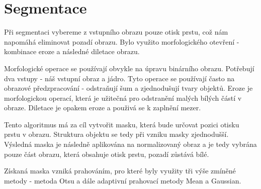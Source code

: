 \section{Segmentace}
Při segmentaci vybereme z vstupního obrazu pouze otisk prstu, což nám napomáhá eliminovat pozadí obrazu. Bylo využito morfologického otevření - kombinace eroze a následné diletace obrazu.

Morfologické operace se používají obvykle na úpravu binárního obrazu. Potřebují dva vstupy - náš vstupní obraz a jádro. \cite{OpenCVMorphology} Tyto operace se používají často na obrazové předzpracování - odstraňují šum a zjednodušují tvary objektů. Eroze je morfologickou operací, která je užitečná pro odstranění malých bílých částí v obraze. Diletace je opakem eroze a použivá se k zaplnění mezer. \cite{ExerciseMorphology}

Tento algoritmus má za cíl vytvořit masku, která bude určovat pozici otisku prstu v obrazu. Struktura objektu se tedy při vzniku masky zjednodušší. Výsledná maska je následně aplikována na normalizovaný obraz a je tedy vybrána pouze část obrazu, která obsahuje otisk prstu, pozadí zůstává bílé.

Získaná maska vzniká prahováním, pro které byly využity tři výše zmíněné metody - metoda Otsu a dále adaptivní prahovací metody Mean a Gaussian.

